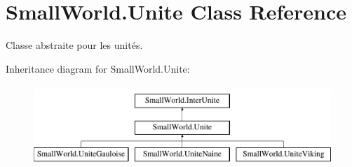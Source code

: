 \hypertarget{class_small_world_1_1_unite}{\section{Small\-World.\-Unite Class Reference}
\label{class_small_world_1_1_unite}
}


Classe abstraite pour les unités.  


Inheritance diagram for Small\-World.\-Unite\-:\begin{figure}[H]
\begin{center}
\leavevmode
\includegraphics[height=3.000000cm]{class_small_world_1_1_unite}
\end{center}
\end{figure}
